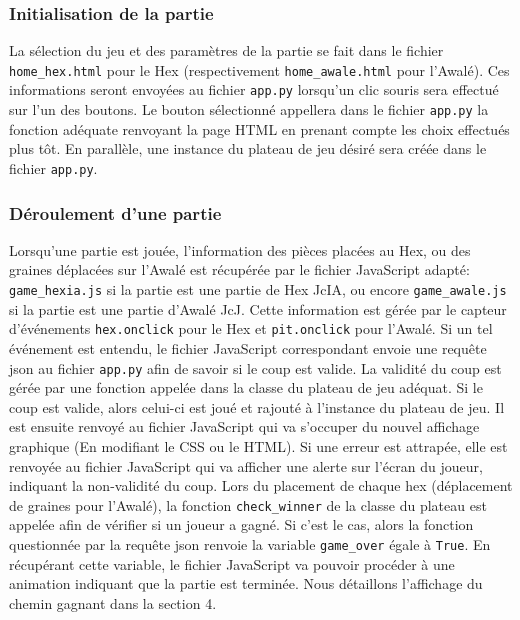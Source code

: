 \subsubsection{Initialisation de la partie}
La sélection du jeu et des paramètres de la partie se fait dans le fichier \texttt{home\_hex.html} pour le Hex
(respectivement \texttt{home\_awale.html} pour l'Awalé). Ces informations seront envoyées au fichier \texttt{app.py}
lorsqu'un clic souris sera effectué sur l'un des boutons. Le bouton sélectionné appellera dans le fichier \texttt{app.py} la 
fonction adéquate renvoyant la page HTML en prenant compte les choix effectués plus tôt. En parallèle, une instance du plateau de
jeu désiré sera créée dans le fichier \texttt{app.py}. 

\subsubsection{Déroulement d'une partie}
Lorsqu'une partie est jouée, l'information des pièces placées au Hex, ou des graines déplacées sur l'Awalé est récupérée par
le fichier JavaScript adapté: \texttt{game\_hexia.js} si la partie est une partie de Hex JcIA, ou encore 
\texttt{game\_awale.js} si la partie est une partie d'Awalé JcJ. Cette information est gérée par le capteur d'événements
\texttt{hex.onclick} pour le Hex et \texttt{pit.onclick} pour l'Awalé. Si un tel événement est entendu, le fichier JavaScript correspondant envoie une requête 
json au fichier \texttt{app.py} afin de savoir si le coup est valide. La validité du coup est gérée par une fonction appelée dans la classe du
plateau de jeu adéquat. Si le coup est valide, alors celui-ci est joué et rajouté à l'instance du plateau de jeu. Il est ensuite renvoyé au fichier 
JavaScript qui va s'occuper du nouvel affichage graphique (En modifiant le CSS ou le HTML). Si une erreur est attrapée, elle est renvoyée
au fichier JavaScript qui va afficher une alerte sur l'écran du joueur, indiquant la non-validité du coup. Lors du placement de chaque
hex (déplacement de graines pour l'Awalé), la fonction \texttt{check\_winner} de la classe du plateau est appelée afin de vérifier si un joueur a 
gagné. Si c'est le cas, alors la fonction questionnée par la requête json renvoie la variable \texttt{game\_over} égale à \texttt{True}. 
En récupérant cette variable, le fichier JavaScript va pouvoir procéder à une animation indiquant que la partie est terminée.
Nous détaillons l'affichage du chemin gagnant dans la section 4.



